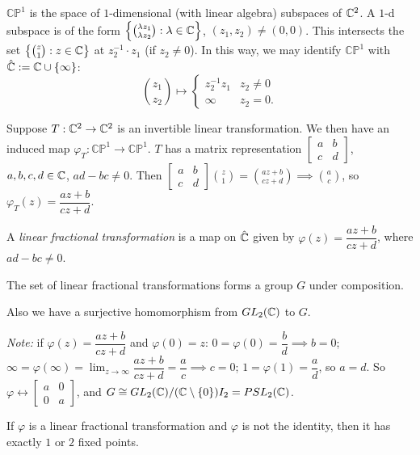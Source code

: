 \documentclass[11pt]{article}
\begin{document}
\begin{definition}
$\mathbb{CP}^1$ is the space of $1$-dimensional (with linear algebra) subspaces of ${\mathbb{C}}^2$. A $1$-d subspace is of the form $\left\{\binom{\lambda z_1}{\lambda z_2} : \lambda \in{\mathbb{C}}\right\}$, $(z_1,z_2)\ne(0,0)$. This intersects the set $\left\{\binom{z}{1} : z\in{\mathbb{C}}\right\}$ at $z_2^{-1}\cdot z_1$ (if $z_2\ne0$). In this way, we may identify $\mathbb{CP}^1$ with $\hat{{\mathbb{C}}} := {\mathbb{C}}\cup\{\infty\}$:
\[
\binom{z_1}{z_2} \mapsto \begin{cases} z_2^{-1}z_1 & z_2\ne0 \\ \infty & z_2=0.\end{cases}
\]
\end{definition}

Suppose $T:{\mathbb{C}}^2\to{\mathbb{C}}^2$ is an invertible linear transformation. We then have an induced map $\varphi_T:\mathbb{CP}^1\to\mathbb{CP}^1$. $T$ has a matrix representation $\begin{bmatrix} a&b\\c&d\end{bmatrix}$, $a,b,c,d\in{\mathbb{C}}$, $ad-bc\ne0$. Then $\begin{bmatrix}a&b\\c&d\end{bmatrix}\binom{z}{1} = \binom{az+b}{cz+d} \implies \binom{a}{c}$, so $\varphi_T(z) = \dfrac{az+b}{cz+d}$.

\begin{definition}
A \emph{linear fractional transformation} is a map on $\hat{{\mathbb{C}}}$ given by $\varphi(z) = \dfrac{az+b}{cz+d}$, where $ad-bc\ne0$.
\end{definition}

\begin{proposition}
The set of linear fractional transformations forms a group $G$ under composition.
\end{proposition}
Also we have a surjective homomorphism from $GL_2({\mathbb{C}})$ to $G$.

\emph{Note:} if $\varphi(z) = \dfrac{az+b}{cz+d}$ and $\varphi(0)=z$: $0 = \varphi(0)=\dfrac{b}{d} \implies b=0$; $\infty = \varphi(\infty) = \lim_{z\to\infty}\dfrac{az+b}{cz+d} = \dfrac{a}{c} \implies c=0$; $1 = \varphi(1) = \dfrac{a}{d}$, so $a=d$. So $\varphi \leftrightarrow \begin{bmatrix}a&0\\0&a\end{bmatrix}$, and $G \cong GL_2({\mathbb{C}})/({\mathbb{C}}\setminus\{0\})I_2 = PSL_2({\mathbb{C}})$.

\begin{proposition}
If $\varphi$ is a linear fractional transformation and $\varphi$ is not the identity, then it has exactly $1$ or $2$ fixed points.
\end{proposition}
\end{document}
